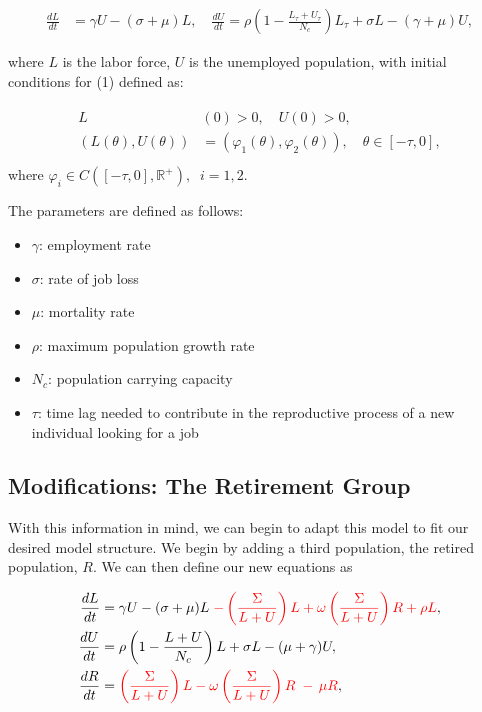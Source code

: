 \documentclass[11pt]{amsart}
\begin{document}
\begin{align}
    \frac{dL}{dt} &= \gamma U - (\sigma + \mu)L, \quad \frac{dU}{dt} = \rho \left(1 - \frac{L_{\tau} + U_{\tau}}{N_c} \right)L_{\tau} + \sigma L - (\gamma + \mu)U,
\end{align}

where $L$ is the labor force, $U$ is the unemployed population, with initial conditions for (1) defined as:

\begin{align}
    \begin{split}
        L&(0) > 0, \quad U(0) > 0, \\
        (L(\theta),U(\theta)) &= (\varphi_1(\theta), \varphi_2(\theta)), \quad \theta \in [-\tau,0], \\
    \end{split}
\end{align}
where $\varphi_i\in C([-\tau, 0], \mathbb{R}^+),\;\; i=1,2$.

The parameters are defined as follows:

\begin{itemize}
    \item $\gamma$: employment rate
    \item $\sigma$: rate of job loss 
    \item $\mu$: mortality rate
    \item $\rho$: maximum population growth rate 
    \item $N_c$: population carrying capacity 
    \item $\tau$: time lag needed to contribute in the reproductive process of a new individual looking for a job
\end{itemize}

\subsection{Modifications: The Retirement Group}
 

With this information in mind, we can begin to adapt this model to fit our desired model structure. We begin by adding a third population, the retired population, $R$.
We can then define our new equations as

\begin{align}
    \begin{split}
        \frac{dL}{dt} &= \gamma U - (\sigma + \mu)L {\color{red}\;- \left(\frac{\Sigma}{L + U}\right) L + \omega\left(\frac{\Sigma}{L + U}\right) R + \rho L},\\
        \frac{dU}{dt} &= \rho\left(1 - \frac{L + U}{N_c} \right)L + \sigma L -(\mu + \gamma)U,  \\
        \frac{dR}{dt} &= {\color{red}\left(\frac{\Sigma}{L + U}\right) L - \omega\left(\frac{\Sigma}{L + U}\right) R \; - \, \mu R},
    \end{split}
\end{align}
\end{document}
